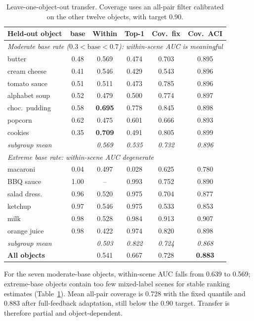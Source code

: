 \documentclass[letterpaper, 10pt, conference]{ieeeconf}
\begin{document}
\begin{table}[t]
\centering
\caption{Leave-one-object-out transfer. Coverage uses an all-pair filter calibrated on the other twelve objects, with target 0.90.}
\label{tab:loo}
\scriptsize
\setlength{\tabcolsep}{2.5pt}
\begin{tabular}{lccccc}
\toprule
Held-out object & base & Within & Top-1 & Cov.\ fix & Cov.\ ACI \\
\midrule
\multicolumn{6}{l}{\emph{Moderate base rate ($0.3<\text{base}<0.7$):
within-scene AUC is meaningful}} \\
butter & 0.48 & 0.569 & 0.474 & 0.703 & 0.895 \\
cream cheese & 0.41 & 0.546 & 0.429 & 0.543 & 0.896 \\
tomato sauce & 0.51 & 0.511 & 0.473 & 0.785 & 0.896 \\
alphabet soup & 0.52 & 0.479 & 0.500 & 0.774 & 0.897 \\
choc.\ pudding & 0.58 & \textbf{0.695} & 0.778 & 0.845 & 0.898 \\
popcorn & 0.62 & 0.475 & 0.601 & 0.666 & 0.893 \\
cookies & 0.35 & \textbf{0.709} & 0.491 & 0.805 & 0.899 \\
\emph{subgroup mean} & & \emph{0.569} & \emph{0.535} & \emph{0.732} &
\emph{0.896} \\
\midrule
\multicolumn{6}{l}{\emph{Extreme base rate: within-scene AUC degenerate}} \\
macaroni & 0.04 & 0.497 & 0.028 & 0.625 & 0.780 \\
BBQ sauce & 1.00 & -- & 0.993 & 0.752 & 0.890 \\
salad dress. & 0.96 & 0.520 & 0.975 & 0.704 & 0.877 \\
ketchup & 0.97 & 0.546 & 0.975 & 0.533 & 0.853 \\
milk & 0.98 & 0.528 & 0.984 & 0.913 & 0.907 \\
orange juice & 0.98 & 0.422 & 0.974 & 0.820 & 0.898 \\
\emph{subgroup mean} & & \emph{0.503} & \emph{0.822} & \emph{0.724} &
\emph{0.868} \\
\midrule
\textbf{All objects} & & 0.541 & 0.667 & 0.728 & \textbf{0.883} \\
\bottomrule
\end{tabular}
\end{table}

For the seven moderate-base objects, within-scene AUC falls from 0.639 to
0.569; extreme-base objects contain too few mixed-label scenes for stable
ranking estimates (Table~\ref{tab:loo}). Mean all-pair coverage is 0.728 with
the fixed quantile and 0.883 after full-feedback adaptation, still below the
0.90 target. Transfer is therefore partial and object-dependent.
\end{document}
